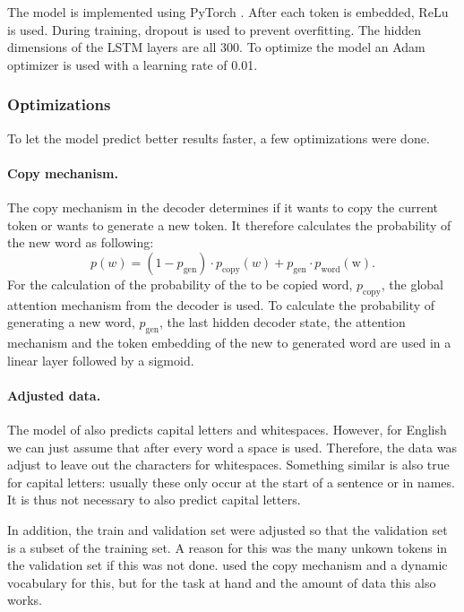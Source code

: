 \documentclass[a4paper, 12pt]{report}
\begin{document}
The model is implemented using PyTorch \cite{pytorch}.
After each token is embedded, ReLu is used. During training, dropout is used to prevent overfitting. 
The hidden dimensions of the LSTM layers are all 300. 
To optimize the model an Adam optimizer is used with a learning rate of 0.01. 

\subsubsection{Optimizations}
To let the model predict better results faster, a few optimizations were done.
\paragraph{Copy mechanism.} The copy mechanism in the decoder determines if it wants to copy the current token or wants to generate a new token. 
It therefore calculates the probability of the new word as following:
\begin{equation}
    p(w) = (1 - p_{\text{gen}}) \cdot p_{\text{copy}}(w) + p_{\text{gen}} \cdot p_{\text{word}}(\text{w}).
\end{equation}
For the calculation of the probability of the to be copied word, $p_{\text{copy}}$, the global attention mechanism from the decoder is used. 
To calculate the probability of generating a new word, $p_{\text{gen}}$, the last hidden decoder state, the attention mechanism and the token embedding of the new to generated word are used in a linear layer followed by a sigmoid. 

\paragraph{Adjusted data.} The model of  also predicts capital letters and whitespaces. 
However, for English we can just assume that after every word a space is used. 
Therefore, the data was adjust to leave out the characters for whitespaces. 
Something similar is also true for capital letters: usually these only occur at the start of a sentence or in names. 
It is thus not necessary to also predict capital letters. 

In addition, the train and validation set were adjusted so that the validation set is a subset of the training set. 
A reason for this was the many unkown tokens in the validation set if this was not done. 
 used the copy mechanism and a dynamic vocabulary for this, but for the task at hand and the amount of data this also works.
\end{document}
